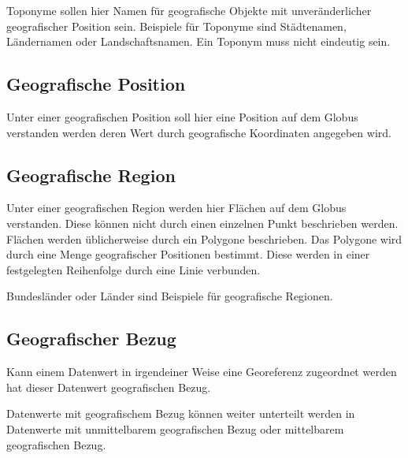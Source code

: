 			Toponyme sollen hier Namen für geografische Objekte mit unveränderlicher geografischer Position sein.
			Beispiele für Toponyme sind Städtenamen, Ländernamen oder Landschaftsnamen.  
			Ein Toponym muss nicht eindeutig sein. 

		\subsection{Geografische Position}
		
			Unter einer geografischen Position soll hier eine Position auf dem Globus verstanden werden deren Wert durch geografische Koordinaten angegeben wird.

		\subsection{Geografische Region} 
			
			Unter einer geografischen Region werden hier Flächen auf dem Globus verstanden.
			Diese können nicht durch einen einzelnen Punkt beschrieben werden. 
			Flächen werden üblicherweise durch ein Polygone beschrieben. 
			Das Polygone wird durch eine Menge geografischer Positionen bestimmt.
			Diese werden in einer festgelegten Reihenfolge durch eine Linie verbunden.

			Bundesländer oder Länder sind Beispiele für geografische Regionen.
			
		\subsection{Geografischer Bezug} 

			Kann einem Datenwert in irgendeiner Weise eine Georeferenz zugeordnet werden hat dieser Datenwert geografischen Bezug.

			Datenwerte mit geografischem Bezug können weiter unterteilt werden in Datenwerte mit unmittelbarem geografischen Bezug oder mittelbarem geografischen Bezug. 

